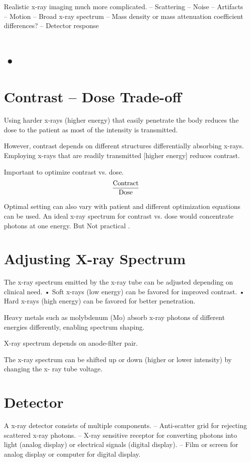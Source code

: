 \documentclass[UTF8,a4paper,11pt]{book}
\theoremstyle{mystyle}{
  \newtheorem{example}{Example}
}
\begin{document}
Realistic x-ray imaging much more
complicated.
– Scattering
– Noise
– Artifacts
– Motion
– Broad x-ray spectrum
– Mass density or mass attenuation coefficient
differences?
– Detector response

\section{•}

\section{Contrast – Dose Trade-off}
Using harder x-rays (higher energy) that easily
penetrate the body reduces the dose to the
patient as most of the intensity is transmitted.

However, contrast depends on different
structures differentially absorbing x-rays.
Employing x-rays that are readily transmitted [higher energy]
reduces contrast.

Important to optimize contrast vs. dose. 
\[
{\rm \frac{Contract}{Dose}}
\]

Optimal setting can also vary with patient and
different optimization equations can be used.
 An ideal x-ray spectrum for contrast vs. dose
would concentrate photons at one energy.
But Not practical .

\section{Adjusting X-ray Spectrum}
 The x-ray spectrum emitted by the x-ray tube
can be adjusted depending on clinical need.
• Soft x-rays (low energy) can be favored for
improved contrast.
• Hard x-rays (high energy) can be favored for
better penetration.

Heavy metals such as molybdenum (Mo)
absorb x-ray photons of different energies
differently, enabling spectrum shaping.


X-ray spectrum depends on anode-filter pair.

The x-ray spectrum can be shifted up or down
(higher or lower intensity) by changing the x-
ray tube voltage.
\section{Detector}
 A x-ray detector consists of multiple
components.
– Anti-scatter grid for rejecting scattered x-ray
photons.
– X-ray sensitive receptor for converting photons
into light (analog display) or electrical signals
(digital display).
– Film or screen for analog display or computer for
digital display.
\end{document}

